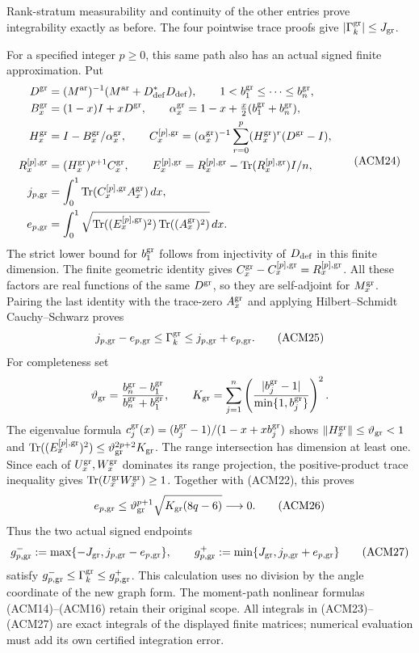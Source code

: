 Rank-stratum measurability and continuity of the other entries
prove integrability exactly as before. The four pointwise trace
proofs give $|\Gamma_k^{\rm gr}|\leq J_{\rm gr}$.

For a specified integer $p\geq0$, this same path also has an
actual signed finite approximation. Put
\[
 \begin{aligned}
 D^{\rm gr}&=(M^{\rm ar})^{-1}
               (M^{\rm ar}+D_{\rm def}^*D_{\rm def}),
 \qquad 1<b_1^{\rm gr}\leq\cdots\leq b_n^{\rm gr},\\
 B_x^{\rm gr}&=(1-x)I+xD^{\rm gr},\qquad
 \alpha_x^{\rm gr}=1-x+\tfrac{x}{2}(b_1^{\rm gr}+b_n^{\rm gr}),\\
 H_x^{\rm gr}&=I-B_x^{\rm gr}/\alpha_x^{\rm gr},\qquad
 C_x^{[p],\rm gr}=(\alpha_x^{\rm gr})^{-1}
     \sum_{r=0}^{p}(H_x^{\rm gr})^r(D^{\rm gr}-I),\\
 R_x^{[p],\rm gr}&=(H_x^{\rm gr})^{p+1}C_x^{\rm gr},\qquad
 E_x^{[p],\rm gr}=R_x^{[p],\rm gr}
                 -\operatorname{Tr}(R_x^{[p],\rm gr})I/n,\\
 j_{p,\rm gr}&=\int_0^1\operatorname{Tr}
                         (C_x^{[p],\rm gr}A_x^{\rm gr})\,dx,\\
 e_{p,\rm gr}&=\int_0^1\sqrt{
 \operatorname{Tr}((E_x^{[p],\rm gr})^2)
 \operatorname{Tr}((A_x^{\rm gr})^2)}\,dx.
 \end{aligned}
 \tag{ACM24}
\]
The strict lower bound for $b_1^{\rm gr}$ follows from injectivity
of $D_{\rm def}$ in this finite dimension. The finite geometric
identity gives $C_x^{\rm gr}-C_x^{[p],\rm gr}=R_x^{[p],\rm gr}$.
All these factors are real functions of the same $D^{\rm gr}$,
so they are self-adjoint for $M_x^{\rm gr}$. Pairing the last
identity with the trace-zero $A_x^{\rm gr}$ and applying
Hilbert--Schmidt Cauchy--Schwarz proves
\[
 j_{p,\rm gr}-e_{p,\rm gr}\leq\Gamma_k^{\rm gr}
                     \leq j_{p,\rm gr}+e_{p,\rm gr}.
 \tag{ACM25}
\]
For completeness set
\[
 \vartheta_{\rm gr}=
 \frac{b_n^{\rm gr}-b_1^{\rm gr}}{b_n^{\rm gr}+b_1^{\rm gr}},
 \qquad
 K_{\rm gr}=\sum_{j=1}^{n}
 \left(\frac{|b_j^{\rm gr}-1|}{\min\{1,b_j^{\rm gr}\}}\right)^2.
\]
The eigenvalue formula
$c_j^{\rm gr}(x)=(b_j^{\rm gr}-1)/(1-x+xb_j^{\rm gr})$
shows $\|H_x^{\rm gr}\|\leq\vartheta_{\rm gr}<1$ and
$\operatorname{Tr}((E_x^{[p],\rm gr})^2)
\leq\vartheta_{\rm gr}^{2p+2}K_{\rm gr}$.
The range intersection has dimension at least one. Since each
of $U_x^{\rm gr},W_x^{\rm gr}$ dominates its range projection,
the positive-product trace inequality gives
$\operatorname{Tr}(U_x^{\rm gr}W_x^{\rm gr})\geq1$.
Together with (ACM22), this proves
\[
 e_{p,\rm gr}\leq\vartheta_{\rm gr}^{p+1}
                   \sqrt{K_{\rm gr}(8q-6)}\longrightarrow0.
 \tag{ACM26}
\]
Thus the two actual signed endpoints
\[
 g_{p,\rm gr}^-:=\max\{-J_{\rm gr},j_{p,\rm gr}-e_{p,\rm gr}\},
 \qquad
 g_{p,\rm gr}^+:=\min\{J_{\rm gr},j_{p,\rm gr}+e_{p,\rm gr}\}
 \tag{ACM27}
\]
satisfy $g_{p,\rm gr}^-\leq\Gamma_k^{\rm gr}
\leq g_{p,\rm gr}^+$. This calculation uses no division by
the angle coordinate of the new graph form. The moment-path
nonlinear formulas (ACM14)--(ACM16) retain their original scope.
All integrals in (ACM23)--(ACM27) are exact integrals of the
displayed finite matrices; numerical evaluation must add its
own certified integration error.

